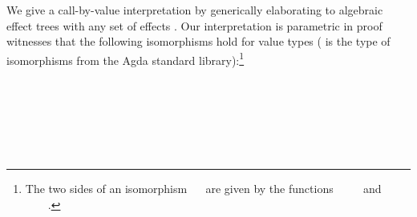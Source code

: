 We give a call-by-value interpretation  by generically elaborating to algebraic effect trees with any set of effects .
Our interpretation is parametric in proof witnesses that the following isomorphisms hold for value types ( is the type of isomorphisms from the Agda standard library):\footnote{The two sides of an isomorphism ~~ are given by the functions ~\as{:}~~~ and ~\as{:}~~~.}
\begin{code}[hide]%
%
\>[4]\AgdaSpace{}%
\AgdaModule{\AgdaUnderscore{}}%
\>[395I]\AgdaSpace{}%
\AgdaSpace{}%
\AgdaSymbol{:}\AgdaSpace{}%
\AgdaSpace{}%
\<%
\\
\>[.][@{}l@{}]\<[395I]%
\>[13]\AgdaSpace{}%
%
\>[401I]\AgdaSymbol{:}\AgdaSpace{}%
\AgdaSymbol{\{}\AgdaSpace{}%
\AgdaSpace{}%
\AgdaSymbol{:}\AgdaSpace{}%
\AgdaSymbol{\}}\<%
\\
\>[.][@{}l@{}]\<[401I]%
\>[20]\AgdaSpace{}%
\AgdaSpace{}%
\AgdaSpace{}%
\AgdaSpace{}%
\AgdaSpace{}%
\AgdaSpace{}%
\AgdaSpace{}%
\AgdaSymbol{(}\AgdaSpace{}%
\AgdaSpace{}%
\AgdaSpace{}%
\AgdaSpace{}%
\AgdaSpace{}%
\AgdaSpace{}%
\AgdaSpace{}%
\AgdaSpace{}%
\AgdaSymbol{)}\AgdaSpace{}%
\<%
\\
%
\>[13]\AgdaSpace{}%
%
\>[423I]\AgdaSymbol{:}\AgdaSpace{}%
\AgdaSymbol{\{}\AgdaSpace{}%
\AgdaSymbol{:}\AgdaSpace{}%
\AgdaSymbol{\}}\<%
\\
\>[.][@{}l@{}]\<[423I]%
\>[20]\AgdaSpace{}%
\AgdaSpace{}%
\AgdaSpace{}%
\AgdaSpace{}%
\AgdaSpace{}%
\AgdaSpace{}%
\AgdaSpace{}%
\AgdaSpace{}%
%
\>[41]\AgdaSpace{}%
\<%
\\
\>[4][@{}l@{\AgdaIndent{0}}]%
\>[6]\AgdaSpace{}%
\AgdaSpace{}%
\AgdaSpace{}%
\AgdaSymbol{(}\AgdaSymbol{;}\AgdaSpace{}%

\end{code}
